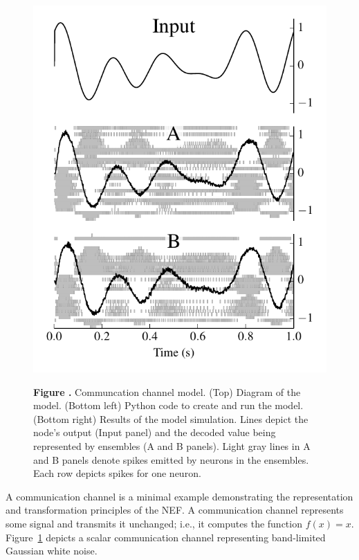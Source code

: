 \documentclass{frontiersSCNS}
\begin{document}
\begin{figure}
\begin{center}
\begin{minipage}{0.37\textwidth}
    \includegraphics[width=\textwidth]{comm_channel_res}
  \end{minipage}
\end{center}
 \textbf{\label{fig:comm-channel}
   Figure .}{
   Communcation channel model. (Top) Diagram of the model.
   (Bottom left) Python code to create and run the model.
   (Bottom right) Results of the model simulation. Lines depict
   the node's output (Input panel) and the decoded value being represented
   by ensembles (A and B panels). Light gray lines in A and B panels denote
   spikes emitted by neurons in the ensembles. Each row depicts spikes
   for one neuron.}
\end{figure}

A communication channel
is a minimal example demonstrating
the representation and transformation principles
of the NEF.
A communication channel
represents some signal and transmits it unchanged;
i.e., it computes the function $f(x) = x$.
Figure~\ref{fig:comm-channel}
depicts a scalar communication channel
representing band-limited Gaussian white noise.
\end{document}
